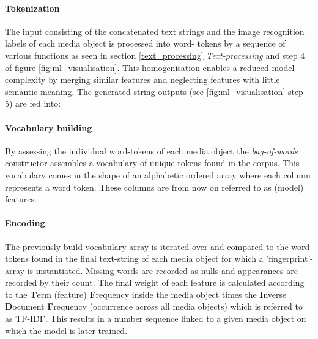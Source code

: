 \paragraph*{Tokenization} The input consisting of the concatenated text strings and the image recognition labels of each media object is processed into word- tokens by a sequence of various functions as seen in section \ref{text_processing} \textit{Text-processing} and step 4 of figure \ref{fig:ml_visualisation}. This homogenisation enables a reduced model complexity by merging similar features and neglecting features with little semantic meaning. The generated string outputs (see \ref{fig:ml_visualisation} step 5) are fed into:

\paragraph*{Vocabulary building} By assessing the individual word-tokens of each media object the \textit{bag-of-words} constructor assembles a vocabulary of unique tokens found in the corpus. This vocabulary comes in the shape of an alphabetic ordered array where each column represents a word token. These columns are from now on referred to as (model) features.

\paragraph*{Encoding} The previously build vocabulary array is iterated over and compared to the word tokens found in the final text-string of each media object for which a 'fingerprint'-array is instantiated. Missing words are recorded as nulls and appearances are recorded by their count. The final weight of each feature is calculated according to the \textbf{T}erm (feature) \textbf{F}requency inside the media object times the \textbf{I}nverse  \textbf{D}ocument  \textbf{F}requency (occurrence across all media objects) which is referred to as TF-IDF. This results in a number sequence linked to a given media object on which the model is later trained.

\clearpage

